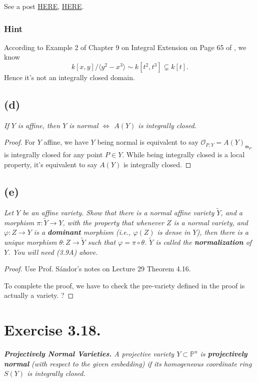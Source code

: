 See a post \href{https://math.stackexchange.com/questions/880433/is-mathbbcx-y-y2-x3-a-pid}{HERE}, \href{https://math.stackexchange.com/questions/2701183/the-following-domain-is-not-integrally-closed-mathbb-cx-y-langle-y2-x3}{HERE}.

\subsubsection{Hint}

According to Example 2 of Chapter 9 on Integral Extension on Page 65 of \cite{matsumura1989commutative}, we know 
\[k[x,y]/\langle y^2-x^3\rangle\sim k[t^2,t^3]\subsetneq k[t].\] Hence it's not an integrally closed domain.

\subsection{(d)}
\textit{If $Y$ is affine, then $Y$ is normal $\Leftrightarrow$ $A(Y)$ is integrally closed.}

\begin{proof}
	For $Y$ affine, we have $Y$ being normal is equivalent to say $\mathscr O_{P,Y}=A(Y)_{\mathfrak m_P}$ is integrally closed for any point $P\in Y$. While being integrally closed is a local property, it's equivalent to say $A(Y)$ is integrally closed.
\end{proof}

\subsection{(e)}
\textit{Let $Y$ be an affine variety. Show that there is a normal affine variety $\widetilde Y$, and a morphism $\pi: \widetilde Y\to Y$, with the property that whenever $Z$ is a normal variety, and $\varphi:Z\to Y$ is a \textbf{dominant} morphism (i.e., $\varphi(Z)$ is dense in $Y$), then there is a unique morphism $\theta:Z\to \widetilde Y$ such that $\varphi=\pi\circ\theta$. $\widetilde Y$ is called the \textbf{normalization} of $Y$. You will need (3.9A) above.}

\begin{proof}
	Use Prof. S\'andor's notes on Lecture 29 Theorem 4.16.

	To complete the proof, we have to check the pre-variety defined in the proof is actually a variety. ?
\end{proof}

\section{Exercise 3.18.}
\textit{\textbf{Projectively Normal Varieties.} A projective variety $Y\subset \mathbb P^n$ is \textbf{projectively normal} (with respect to the given embedding) if its homogeneous coordinate ring $S(Y)$ is integrally closed.}

